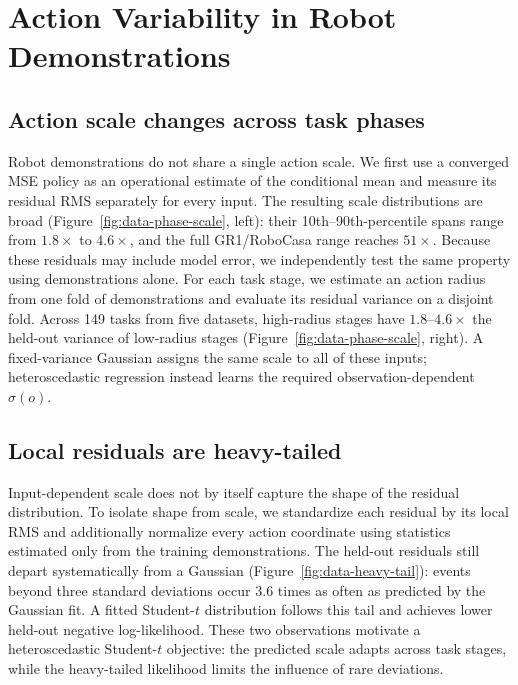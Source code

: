 \section{Action Variability in Robot Demonstrations}
\label{sec:data-structure}

\subsection{Action scale changes across task phases}

Robot demonstrations do not share a single action scale. We first use a
converged MSE policy as an operational estimate of the conditional mean and
measure its residual RMS separately for every input. The resulting scale
distributions are broad (Figure~\ref{fig:data-phase-scale}, left): their
10th--90th-percentile spans range from $1.8\times$ to $4.6\times$, and the full
GR1/RoboCasa range reaches $51\times$. Because these residuals may include model
error, we independently test the same property using demonstrations alone. For
each task stage, we estimate an action radius from one fold of demonstrations
and evaluate its residual variance on a disjoint fold. Across 149 tasks from
five datasets, high-radius stages have $1.8$--$4.6\times$ the held-out variance
of low-radius stages (Figure~\ref{fig:data-phase-scale}, right). A fixed-variance
Gaussian assigns the same scale to all of these inputs; heteroscedastic
regression instead learns the required observation-dependent $\sigma(o)$.

\subsection{Local residuals are heavy-tailed}

Input-dependent scale does not by itself capture the shape of the residual
distribution. To isolate shape from scale, we standardize each residual by its
local RMS and additionally normalize every action coordinate using statistics
estimated only from the training demonstrations. The held-out residuals still
depart systematically from a Gaussian (Figure~\ref{fig:data-heavy-tail}):
events beyond three standard deviations occur 3.6 times as often as predicted
by the Gaussian fit. A fitted Student-$t$ distribution follows this tail and
achieves lower held-out negative log-likelihood. These two observations
motivate a heteroscedastic Student-$t$ objective: the predicted scale adapts
across task stages, while the heavy-tailed likelihood limits the influence of
rare deviations.
